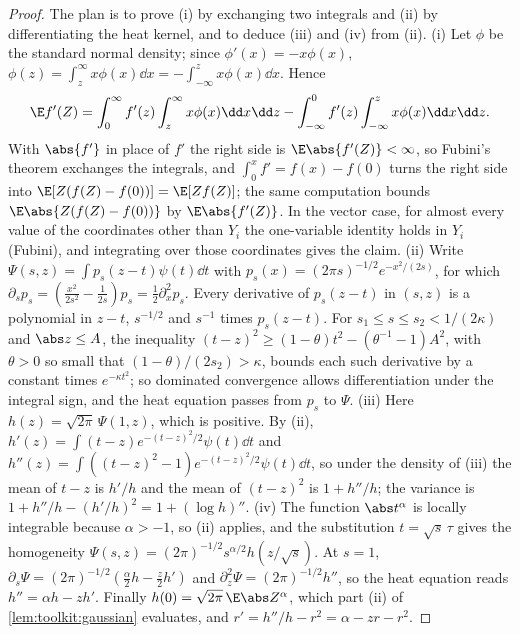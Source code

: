 \begin{refsection}
\begin{proof}
The plan is to prove (i) by exchanging two integrals and (ii) by differentiating the heat kernel, and to deduce (iii) and (iv) from (ii). (i) Let $\phi$ be the standard normal density; since $\phi'(x)=-x\phi(x)$, $\phi(z)=\int_z^\infty x\phi(x)\dd x=-\int_{-\infty}^zx\phi(x)\dd x$. Hence
\[
\E f'(Z)=\int_0^\infty f'(z)\int_z^\infty x\phi(x)\dd x\dd z-\int_{-\infty}^0f'(z)\int_{-\infty}^zx\phi(x)\dd x\dd z.
\]
With $\abs{f'}$ in place of $f'$ the right side is $\E\abs{f'(Z)}<\infty$, so Fubini's theorem exchanges the integrals, and $\int_0^xf'=f(x)-f(0)$ turns the right side into $\E[Z(f(Z)-f(0))]=\E[Zf(Z)]$; the same computation bounds $\E\abs{Z(f(Z)-f(0))}$ by $\E\abs{f'(Z)}$. In the vector case, for almost every value of the coordinates other than $Y_i$ the one-variable identity holds in $Y_i$ (Fubini), and integrating over those coordinates gives the claim.
(ii) Write $\Psi(s,z)=\int p_s(z-t)\psi(t)\dd t$ with $p_s(x)=(2\pi s)^{-1/2}e^{-x^2/(2s)}$, for which $\partial_sp_s=(\frac{x^2}{2s^2}-\frac1{2s})p_s=\frac12\partial_x^2p_s$. Every derivative of $p_s(z-t)$ in $(s,z)$ is a polynomial in $z-t$, $s^{-1/2}$ and $s^{-1}$ times $p_s(z-t)$. For $s_1\le s\le s_2<1/(2\kappa)$ and $\abs z\le A$, the inequality $(t-z)^2\ge(1-\theta)t^2-(\theta^{-1}-1)A^2$, with $\theta>0$ so small that $(1-\theta)/(2s_2)>\kappa$, bounds each such derivative by a constant times $e^{-\kappa t^2}$; so dominated convergence allows differentiation under the integral sign, and the heat equation passes from $p_s$ to $\Psi$.
(iii) Here $h(z)=\sqrt{2\pi}\,\Psi(1,z)$, which is positive. By (ii), $h'(z)=\int(t-z)e^{-(t-z)^2/2}\psi(t)\dd t$ and $h''(z)=\int((t-z)^2-1)e^{-(t-z)^2/2}\psi(t)\dd t$, so under the density of (iii) the mean of $t-z$ is $h'/h$ and the mean of $(t-z)^2$ is $1+h''/h$; the variance is $1+h''/h-(h'/h)^2=1+(\log h)''$.
(iv) The function $\abs t^\alpha$ is locally integrable because $\alpha>-1$, so (ii) applies, and the substitution $t=\sqrt s\,\tau$ gives the homogeneity $\Psi(s,z)=(2\pi)^{-1/2}s^{\alpha/2}h(z/\sqrt s)$. At $s=1$, $\partial_s\Psi=(2\pi)^{-1/2}(\frac\alpha2h-\frac z2h')$ and $\partial_z^2\Psi=(2\pi)^{-1/2}h''$, so the heat equation reads $h''=\alpha h-zh'$. Finally $h(0)=\sqrt{2\pi}\,\E\abs Z^\alpha$, which part (ii) of \cref{lem:toolkit:gaussian} evaluates, and $r'=h''/h-r^2=\alpha-zr-r^2$.
\end{proof}


\end{refsection}
